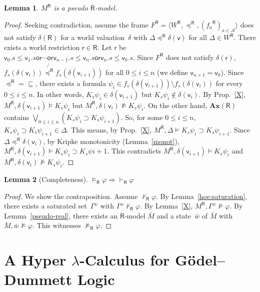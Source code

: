 \documentclass[doctor]{iscs-thesis}
\newcommand{\agents}{\mathcal A}
\newcommand{\tuple}[1]{\langle{#1}\rangle}
\newcommand{\vdashR}{\vdash_{\mathsf R}}
\newcommand{\R}[1]{{#1}^{\mathsf R}}
\newcommand{\modelsR}{\models_{\mathsf R}}
\newtheorem{lemma}{Lemma}
\newcommand{\wor}{\mathsf{{or}}}
\begin{document}
\begin{lemma}
 $\R M$ is a pseudo $\mathsf R$-model.
\end{lemma}
\begin{proof}
 Seeking contradiction,
 assume the frame $\R F = \tuple{\R W, \R\preceq, (\R
 {f_a})_{a\in\agents}}$
 does not satisfy $\delta(\mathsf R)$ for
 a world valuation~$\delta$ with
 $\Delta\R\preceq\delta(\mathsf v)$ for all $\Delta\in\R W$.
 There exists a world restriction
 $\mathsf r\in\mathsf R$.
 Let $\mathsf r$ be $\mathsf v_0.s\le\mathsf v_1.s\wor\cdots \wor\mathsf
 v_{n-1}.s\le\mathsf v_n.s\wor\mathsf v_n.s\le\mathsf v_0.s$.
 Since $\R F$ does not satisfy $\delta(\mathsf r)$,
 $f_s(\delta(\mathsf v_i))\not{\R \preceq}f_s(\delta(\mathsf v_{i+1}))$
 for
 all $0\le i\le n$ (we define $\mathsf v_{n+1} = \mathsf v_0$).
 Since $\R\preceq = \subseteq$, there exists
 a formula $\psi_i\in f_s(\delta(\mathsf v_{i+1}))\setminus
 f_s(\delta(\mathsf v_i))$ for every $0\le i\le n$.
 In other words, $K_s\psi_i\in\delta(\mathsf v_{i+1})$
 but $K_s\psi_i\notin\delta(\mathsf v_i)$.
 By Prop.~\ref{X},
 $\R M,\delta(\mathsf v_{i+1})\models K_s\psi_i$ but
 $\R M,\delta(\mathsf v_{i})\not\models K_s\psi_i$.
 On the other hand, $\mathbf{Ax}(\mathsf R)$ contains
 $\bigvee_{0\le i\le n}\left(K_s\psi_i\supset K_s\psi_{i+1}\right)$.
 So, for some $0\le i\le n$,
 $K_s\psi_i\supset K_s\psi_{i+1}\in\Delta$.
 This means, by Prop.~\ref{X},
 $\R M,\Delta\models K_s\psi_i\supset K_s\psi_{i+1}$.
 Since $\Delta\R\preceq\delta(\mathsf v_i)$,
 by Kripke monotonicity (Lemma~\ref{monot}),
 $\R M,\delta(\mathsf v_{i+1})\models K_s\psi_i\supset K_s\psi{i+1}$.
 This contradicts $\R M,\delta(\mathsf v_{i+1})\models K_s\psi_i$ and
 $\R M,\delta(\mathsf v_i)\not\models K_s\psi_i$.
\end{proof}
 
\begin{lemma}[Completeness]
 $\modelsR\varphi\Longrightarrow\vdashR\varphi$
\end{lemma}
\begin{proof}
 We show the contraposition.
 Assume $\not\vdashR \varphi$. By
 Lemma~\ref{hoe:saturation}, there exists
 a saturated set~$\Gamma^\omega$ with $\Gamma^\omega\not\vdashR\varphi$.
 By Lemma~\ref{X}, $\R M, \Gamma^\omega\not\models\varphi$.
 By Lemma~\ref{pseudo-real}, there exists an
 $\mathsf R$-model $\bar M$ and a state~$\bar w$ of $\bar M$
 with $\bar M,\bar w\not\models \varphi$.
 This witnesses $\not\modelsR\varphi$.
\end{proof}

\chapter{A Hyper $\lambda$-Calculus for G\"odel--Dummett Logic}
\end{document}
